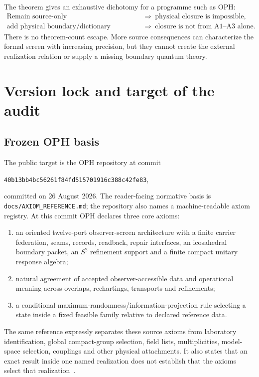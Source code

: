 \documentclass[10pt,a4paper]{article}
\theoremstyle{definition}
\theoremstyle{remark}
\begin{document}
The theorem gives an exhaustive dichotomy for a programme such as OPH:
\[
\boxed{
\begin{array}{ll}
\text{Remain source-only} & \Longrightarrow\ \text{physical closure is impossible},\\[1.5mm]
\text{add physical boundary/dictionary structure} & \Longrightarrow\ \text{closure is not from A1--A3 alone}.
\end{array}}
\]
There is no theorem-count escape.  More source consequences can characterize
the formal screen with increasing precision, but they cannot create the
external realization relation or supply a missing boundary quantum theory.

\section{Version lock and target of the audit}
\label{sec:versionlock}

\subsection{Frozen OPH basis}

The public target is the OPH repository at commit
\begin{center}
\texttt{40b13bb4bc56261f84fd515701916c388c42fe83},
\end{center}
committed on 26 August 2026.  The reader-facing normative basis is
\texttt{docs/AXIOM\_REFERENCE.md}; the repository also names a machine-readable
axiom registry.  At this commit OPH declares three core axioms:

\begin{enumerate}[label=\textbf{A\arabic*.}]
\item an oriented twelve-port observer-screen architecture with a finite
carrier federation, seams, records, readback, repair interfaces, an
icosahedral boundary packet, an \(S^2\) refinement support and a finite compact
unitary response algebra;
\item natural agreement of accepted observer-accessible data and operational
meaning across overlaps, rechartings, transports and refinements;
\item a conditional maximum-randomness/information-projection rule selecting a
state inside a fixed feasible family relative to declared reference data.
\end{enumerate}

The same reference expressly separates these source axioms from laboratory
identification, global compact-group selection, field lists, multiplicities,
model-space selection, couplings and other physical attachments.  It also
states that an exact result inside one named realization does not establish
that the axioms select that realization~\cite{OPHAxiomReference}.
\end{document}
